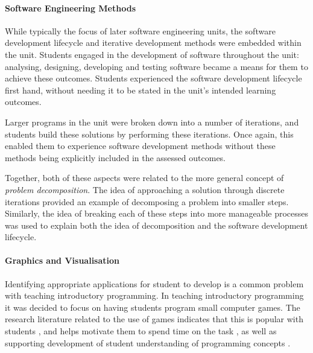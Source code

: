  
\paragraph{Software Engineering Methods} %
\label{par:software_engineering_methods}

While typically the focus of later software engineering units, the software development lifecycle and iterative development methods were embedded within the unit. Students engaged in the development of software throughout the unit: analysing, designing, developing and testing software became a means for them to achieve these outcomes. Students experienced the software development lifecycle first hand, without needing it to be stated in the unit's intended learning outcomes.

Larger programs in the unit were broken down into a number of iterations, and students build these solutions by performing these iterations. Once again, this enabled them to experience software development methods without these methods being explicitly included in the assessed outcomes.

Together, both of these aspects were related to the more general concept of \emph{problem decomposition}. The idea of approaching a solution through discrete iterations provided an example of decomposing a problem into smaller steps. Similarly, the idea of breaking each of these steps into more manageable processes was used to explain both the idea of decomposition and the software development lifecycle. 


\paragraph{Graphics and Visualisation} %
\label{par:graphics_and_visualisation}

Identifying appropriate applications for student to develop is a common problem with teaching introductory programming. In teaching introductory programming it was decided to focus on having students program small computer games. The research literature related to the use of games indicates that this is popular with students \cite{Bayliss:2006}, and helps motivate them to spend time on the task \cite{Feldgen:2004,Rajaravivarma:2005,Cliburn:2006}, as well as supporting development of student understanding of programming concepts \cite{Roberts:1995,Leutenegger:2007}.


